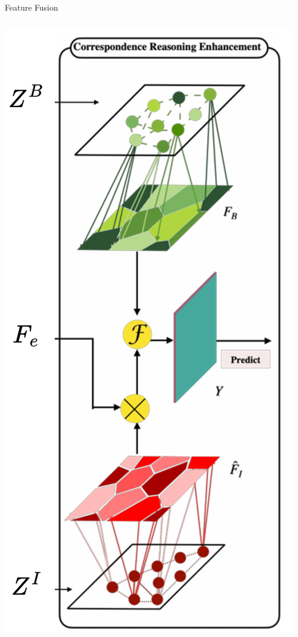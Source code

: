 \documentclass[8pt,aspectratio=169,xcolor=dvipsnames]{beamer}
\begin{document}
\begin{frame}{Feature Fusion}
    \begin{columns}
        \begin{center}
        \includegraphics[width=\linewidth]{fusion.png}
        \end{center}
        

\end{columns}
\end{frame}
\end{document}
